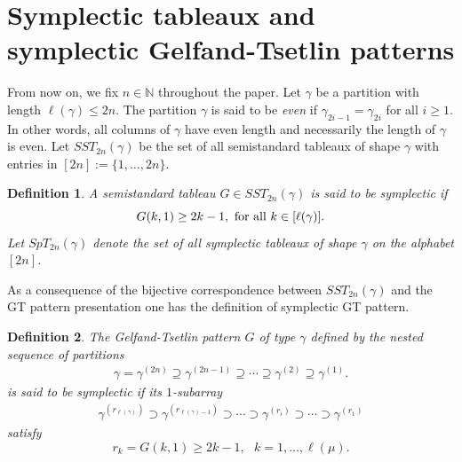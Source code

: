 \documentclass[reqno]{amsart}
\theoremstyle{tplain}
\newtheorem{defi}{Definition}
\begin{document}
{\section{Symplectic tableaux and symplectic Gelfand-Tsetlin patterns}\label{sec:symplectic}
From now on, we fix $n\in \mathbb{N}$ throughout the paper. Let $\gamma$ be a partition with length $\ell(\gamma)\le 2n$. The partition $\gamma$ is said to be \emph{even} if $\gamma_{2i-1}=\gamma_{2i}$ for all $i\ge 1$. In other words, all columns of $\gamma$ have even length and necessarily the length of $\gamma$ is even.
Let $SST_{2n}(\gamma)$ be the set of all
semistandard tableaux of shape $\gamma$ with entries in $[2n]:=\{1,\dots,2n\}$.


\begin{defi}\cite{king76} \label{def:symp}A semistandard tableau $G \in SST_{2n}(\gamma)$ is said to
be symplectic if
$$G(k, 1) \ge 2k-1, \mbox{  for all $  k \in  [ \ell(\gamma)]$}.$$
Let $SpT_{2n}(\gamma)$ denote the set of all symplectic tableaux of shape $\gamma$ on the alphabet $[2n]$.
\end{defi}

As a consequence of the bijective correspondence between $SST_{2n}(\gamma)$ and the GT pattern presentation one has the definition of symplectic GT pattern.
\begin{defi}\label{def:sympgt} The Gelfand-Tsetlin  pattern $G$ of type $\gamma$ defined by the nested sequence of partitions
\begin{align*}\gamma=\gamma^{(2n)}\supseteq \gamma^{(2n-1)}
\supseteq \cdots \supseteq \gamma^{(2)}\supseteq\gamma^{(1)}.%
\end{align*}  is said to be symplectic if its  $1$-subarray
~%
\begin{align*}\gamma^{(r_{\ell(\gamma)})}\supset \gamma^{(r_{\ell(\gamma)-1})}
\supset \cdots \supset \gamma^{(r_i)}\supset\cdots\supset \gamma^{(r_1)}%
\end{align*}
 satisfy
$$r_k=G(k,1)\ge 2k-1, \mbox{ $k=1,\dots,\ell(\mu).$}$$
\end{defi}

}
\end{document}
